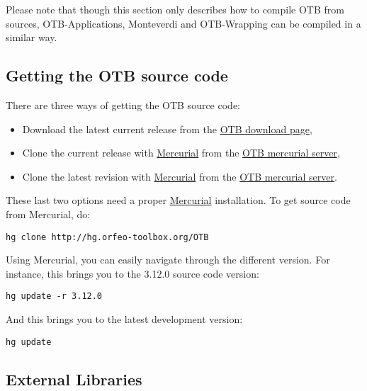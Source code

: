 Please note that though this section only describes how to compile OTB from sources,
OTB-Applications, Monteverdi and OTB-Wrapping can be compiled in a similar way.

\subsection{Getting the OTB source code}

There are three ways of getting the OTB source code:
\begin{itemize}
\item Download the latest current release from the \href{http://sourceforge.net/projects/orfeo-toolbox/}{OTB download page},
\item Clone the current release with \href{http://mercurial.selenic.com}{Mercurial} from the \href{http://hg.orfeo-toolbox.org/OTB}{OTB mercurial server},
\item Clone the latest revision with \href{http://mercurial.selenic.com}{Mercurial} from the \href{http://hg.orfeo-toolbox.org/OTB}{OTB mercurial server}.
\end{itemize}

These last two options need a proper \href{http://mercurial.selenic.com}{Mercurial} installation. To get source code from Mercurial, do:
\begin{verbatim}
hg clone http://hg.orfeo-toolbox.org/OTB
\end{verbatim}

Using Mercurial, you can easily navigate through the different version. For instance, this brings you to the 3.12.0 source code version:
\begin{verbatim}
hg update -r 3.12.0
\end{verbatim}

And this brings you to the latest development version:
\begin{verbatim}
hg update
\end{verbatim}


\subsection{External Libraries}

